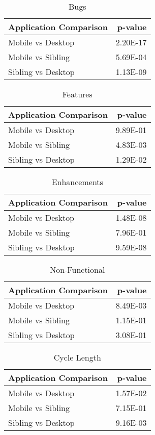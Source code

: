 \begin{table}[ht]
\centering
\caption{Bugs} 
\begin{tabular}{lr}
  \hline
Application Comparison & p-value \\ 
  \hline
Mobile vs Desktop & 2.20E-17 \\ 
  Mobile vs Sibling & 5.69E-04 \\ 
  Sibling vs Desktop & 1.13E-09 \\ 
   \hline
\end{tabular}
\end{table}
\begin{table}[ht]
\centering
\caption{Features} 
\begin{tabular}{lr}
  \hline
Application Comparison & p-value \\ 
  \hline
Mobile vs Desktop & 9.89E-01 \\ 
  Mobile vs Sibling & 4.83E-03 \\ 
  Sibling vs Desktop & 1.29E-02 \\ 
   \hline
\end{tabular}
\end{table}
\begin{table}[ht]
\centering
\caption{Enhancements} 
\begin{tabular}{lr}
  \hline
Application Comparison & p-value \\ 
  \hline
Mobile vs Desktop & 1.48E-08 \\ 
  Mobile vs Sibling & 7.96E-01 \\ 
  Sibling vs Desktop & 9.59E-08 \\ 
   \hline
\end{tabular}
\end{table}
\begin{table}[ht]
\centering
\caption{Non-Functional} 
\begin{tabular}{lr}
  \hline
Application Comparison & p-value \\ 
  \hline
Mobile vs Desktop & 8.49E-03 \\ 
  Mobile vs Sibling & 1.15E-01 \\ 
  Sibling vs Desktop & 3.08E-01 \\ 
   \hline
\end{tabular}
\end{table}
\begin{table}[ht]
\centering
\caption{Cycle Length} 
\begin{tabular}{lr}
  \hline
Application Comparison & p-value \\ 
  \hline
Mobile vs Desktop & 1.57E-02 \\ 
  Mobile vs Sibling & 7.15E-01 \\ 
  Sibling vs Desktop & 9.16E-03 \\ 
   \hline
\end{tabular}
\end{table}
